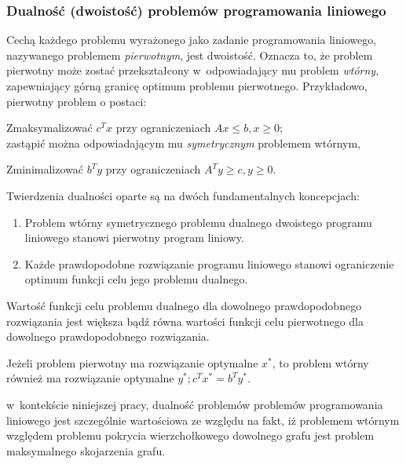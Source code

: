 \subsubsection{\textbf{Dualność (dwoistość) problemów programowania liniowego}}
\label{sss_lp_duality}
\par{
  Cechą każdego problemu wyrażonego jako zadanie programowania liniowego,
  nazywanego problemem \emph{pierwotnym}, jest dwoistość.
  Oznacza to, że problem pierwotny może zostać przekształcony w~odpowiadający mu
  problem \emph{wtórny}, zapewniający górną granicę optimum problemu
  pierwotnego. 
  Przykładowo, pierwotny problem o postaci:\par
  Zmaksymalizować $c^{T}x$ przy ograniczeniach $Ax\leq b, x \geq 0$;\\
  zastąpić można odpowiadającym mu \emph{symetrycznym} problemem wtórnym,\par
  Zminimalizować $b^{T}y$ przy ograniczeniach $A^{T}y \geq c, y \geq 0$.\\
}
\par{
  Twierdzenia dualności oparte są na dwóch fundamentalnych koncepcjach:
  \begin{enumerate}
    \item Problem wtórny symetrycznego problemu dualnego dwoistego programu
      liniowego stanowi pierwotny program liniowy.
    \item Każde prawdopodobne rozwiązanie programu liniowego stanowi
      ograniczenie optimum funkcji celu jego problemu dualnego.
  \end{enumerate}

  \begin{theorem}
    Wartość funkcji celu problemu dualnego dla dowolnego prawdopodobnego
    rozwiązania jest większa bądź równa wartości funkcji celu pierwotnego dla
    dowolnego prawdopodobnego rozwiązania.
  \end{theorem}
  \begin{theorem}
    Jeżeli problem pierwotny ma rozwiązanie optymalne $x^*$, to problem 
    wtórny również ma rozwiązanie optymalne $y^*; c^{T}x^*=b^{T}y^*$.
  \end{theorem}
}

\par{
  w~kontekście niniejszej pracy, dualność problemów problemów programowania
  liniowego jest szczególnie wartościowa ze względu na fakt, iż problemem
  wtórnym względem problemu pokrycia wierzchołkowego dowolnego grafu jest 
  problem maksymalnego skojarzenia grafu.
}

